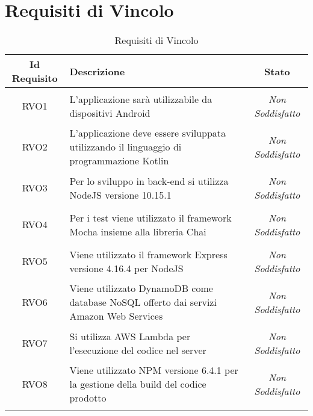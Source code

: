 \section{Requisiti di Vincolo}
\normalsize
\begin{longtable}{|c|>{\centering}m{7cm}|c|}
	\hline 
	\textbf{Id Requisito} & \textbf{Descrizione} & \textbf{Stato}\\
	\hline
	\endhead
	\hypertarget{RVO1}{RVO1} & L'applicazione sarà utilizzabile da dispositivi Android & \textit{Non Soddisfatto}\\ \hline
	
	\hypertarget{RVO2}{RVO2} & L'applicazione deve essere sviluppata utilizzando il linguaggio di programmazione Kotlin & \textit{Non Soddisfatto}\\ \hline
	
	\hypertarget{RVO3}{RVO3} & Per lo sviluppo in back-end si utilizza NodeJS versione 10.15.1 & \textit{Non Soddisfatto}\\ \hline
	
	\hypertarget{RVO4}{RVO4} & Per i test viene utilizzato il framework Mocha insieme alla libreria Chai & \textit{Non Soddisfatto}\\ \hline
	
	\hypertarget{RVO5}{RVO5} & Viene utilizzato il framework Express versione 4.16.4 per NodeJS & \textit{Non Soddisfatto}\\ \hline
	
	\hypertarget{RVO6}{RVO6} & Viene utilizzato DynamoDB come database NoSQL offerto dai servizi Amazon Web Services & \textit{Non Soddisfatto}\\ \hline
	
	\hypertarget{RVO7}{RVO7} & Si utilizza AWS Lambda per l'esecuzione del codice nel server & \textit{Non Soddisfatto}\\ \hline
	
	\hypertarget{RVO8}{RVO8} & Viene utilizzato NPM versione 6.4.1 per la gestione della build del codice prodotto & \textit{Non Soddisfatto}\\ \hline
	
	\caption[Requisiti di Vincolo]{Requisiti di Vincolo}
	\label{tabella:req3}
\end{longtable}
\clearpage

